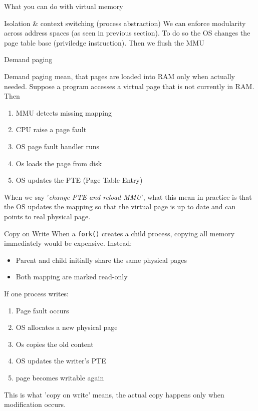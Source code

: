 \documentclass[a4paper]{book}
\begin{document}
\begin{parag}{What you can do with virtual memory}
	\begin{subparag}{Isolation \& context switching (process abstraction)}
       We can enforce modularity across address spaces (as seen in previous section). To do so the OS changes the page table base (priviledge instruction). Then we flush the MMU\\
   \end{subparag}
   \begin{subparag}{Demand paging}
       
	   Demand paging mean, that pages are loaded into RAM only when actually needed. Suppose a program accesses a virtual page that is not currently in RAM. Then 
	   \begin{enumerate}
	       \item MMU detects missing mapping
	       \item CPU raise a page fault
	       \item OS page fault handler runs
	       \item Os loads the page from disk
	       \item OS updates the PTE (Page Table Entry)
	   \end{enumerate}
	   When we say '\textit{change PTE and reload MMU}', what this mean in practice is that the OS updates the mapping so that the virtual page is up to date and can points to real physical page.
   \end{subparag}
   \begin{subparag}{Copy on Write}
       When a \texttt{fork()} creates a child process, copying all memory immediately would be expensive. Instead:
	   \begin{itemize}
	       \item Parent and child initially share the same physical pages
	       \item Both mapping are marked read-only
	   \end{itemize}
	   If one process writes:
	   \begin{enumerate}
	       \item Page fault occurs
	       \item OS allocates a new physical page
	       \item Os copies the old content
	       \item OS updates the writer's PTE
	       \item page becomes writable again
	   \end{enumerate}
	   This is what 'copy on write' means, the actual copy happens only when modification occurs.
	   
	   
	   
   \end{subparag}
\end{parag}
\end{document}
